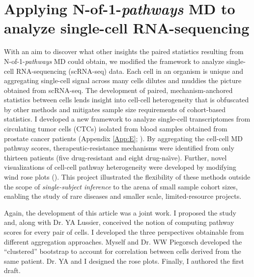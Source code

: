 \chapter{Applying N-of-1-\emph{pathways} MD to\\analyze single-cell RNA-sequencing} \label{Chap:ctcs}

\indent \indent With an aim to discover what other insights the paired statistics resulting from N-of-1-\emph{pathways} MD could obtain, we modified the framework to analyze single-cell RNA-sequencing (scRNA-seq) data. Each cell in an organism is unique and aggregating single-cell signal across many cells dilutes and muddies the picture obtained from scRNA-seq. The development of paired, mechanism-anchored statistics between cells lends insight into cell-cell heterogeneity that is obfuscated by other methods and mitigates sample size requirements of cohort-based statistics. I developed a new framework to analyze single-cell transcriptomes from circulating tumor cells (CTCs) isolated from blood samples obtained from prostate cancer patients (Appendix \ref{App:E}; \cite{Patel2014,Schissler2016}). By aggregating the cell-cell MD pathway scores, therapeutic-resistance mechanisms were identified from only thirteen patients (five drug-resistant and eight drug-na\"{\i}ve). Further, novel visualizations of cell-cell pathway heterogeneity were developed by modifying wind rose plots (\cite{Court1963}). This project illustrated the flexibility of these methods outside the scope of \emph{single-subject inference} to the arena of small sample cohort sizes, enabling the study of rare diseases and smaller scale, limited-resource projects.

Again, the development of this article was a joint work. I proposed the study and, along with Dr. YA Lussier, conceived the notion of computing pathway scores for every pair of cells. I developed the three perspectives obtainable from different aggregation approaches. Myself and Dr. WW Piegorsch developed the ``clustered'' bootstrap to account for correlation between cells derived from the same patient. Dr. YA and I designed the rose plots. Finally, I authored the first draft.
